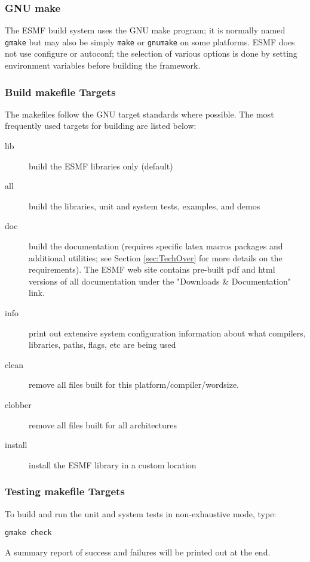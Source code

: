 \subsubsection{GNU make}
The ESMF build system uses the GNU make program; it is normally named 
{\tt gmake} but may also be simply {\tt make} or {\tt gnumake} on some 
platforms.  ESMF does not use configure or autoconf;  the selection of 
various options is done by
setting environment variables before building the framework. 

\subsubsection{Build makefile Targets}

The makefiles follow the GNU target standards where possible.
The most frequently used targets for building are listed below:
\begin{description}
\item[lib] build the ESMF libraries only (default)
\item[all] build the libraries, unit and system tests, examples, and demos
\item[doc] build the documentation (requires specific latex macros packages
and additional utilities; see Section \ref{sec:TechOver} for more details
on the requirements).  The ESMF web site 
contains pre-built pdf and html versions of all documentation
under the "Downloads \& Documentation" link.
\item[info] print out extensive system configuration information about what
           compilers, libraries, paths, flags, etc are being used
\item[clean] remove all files built for this platform/compiler/wordsize.
\item[clobber] remove all files built for all architectures
\item[install] install the ESMF library in a custom location
\end{description}


\subsubsection{Testing makefile Targets}

To build and run the unit and system tests in non-exhaustive mode, type:
\begin{verbatim}
gmake check
\end{verbatim}
A summary report of success and failures will be printed out at the end.

